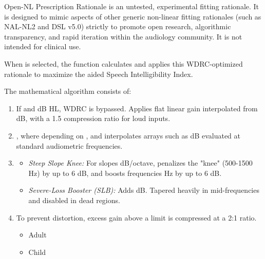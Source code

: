 \documentclass[letterpaper]{book}
\begin{document}
\begin{Section}{Open-NL Prescription Rationale}
  is an untested, experimental fitting rationale. It is designed to mimic aspects of other generic non-linear fitting rationales (such as NAL-NL2 and DSL v5.0) strictly to promote open research, algorithmic transparency, and rapid iteration within the audiology community. It is not intended for clinical use.

When  is selected, the function calculates and applies this WDRC-optimized rationale to maximize the aided Speech Intelligibility Index.

The mathematical algorithm consists of:
\begin{enumerate}

\item{}  If  and  dB HL, WDRC is bypassed. Applies flat linear gain interpolated from  dB, with a 1.5 compression ratio for loud inputs.
\item{}  , where  depending on , and  interpolates arrays such as  dB evaluated at standard audiometric frequencies.
\item{} 
\begin{itemize}

\item{} \emph{Steep Slope Knee:} For slopes  dB/octave, penalizes the "knee" (500-1500 Hz) by up to 6 dB, and boosts frequencies  Hz by up to 6 dB.
\item{} \emph{Severe-Loss Booster (SLB):} Adds  dB. Tapered heavily in mid-frequencies and disabled in dead regions.

\end{itemize}

\item{}  To prevent distortion, excess gain above a limit is compressed at a 2:1 ratio.
\begin{itemize}

\item{} Adult 
\item{} Child 


\end{itemize}
\end{enumerate}
\end{Section}
\end{document}
